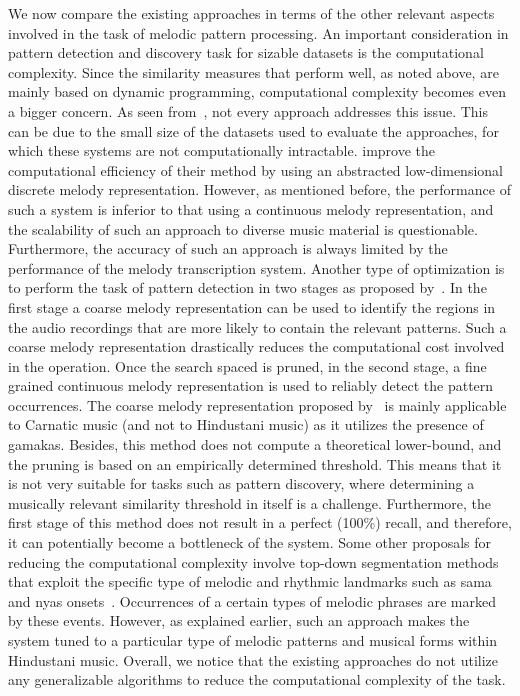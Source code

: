 We now compare the existing approaches in terms of the other relevant aspects involved in the task of melodic pattern processing. An important consideration in  pattern detection and discovery task for sizable datasets is the computational complexity. Since the similarity measures that perform well, as noted above, are mainly based on dynamic programming, computational complexity becomes even a bigger concern. As seen from~, not every approach addresses this issue. This can be due to the small size of the datasets used to evaluate the approaches, for which these systems are not computationally intractable. \cite{ganguli2015efficient} improve the computational efficiency of their method by using an abstracted low-dimensional discrete melody representation. However, as mentioned before, the performance of such a system is inferior to that using a continuous melody representation, and the scalability of such an approach to diverse music material is questionable. Furthermore, the accuracy of such an approach is always limited by the performance of the melody transcription system. Another type of optimization is to perform the task of pattern detection in two stages as proposed by~\cite{dutta2014modified,Ishwar2013}. In the first stage a coarse melody representation can be used to identify the regions in the audio recordings that are more likely to contain the relevant patterns. Such a coarse melody representation drastically reduces the computational cost involved in the operation. Once the search spaced is pruned, in the second stage, a fine grained continuous melody representation is used to reliably detect the pattern occurrences. The coarse melody representation proposed by~\cite{Ishwar2013} is mainly applicable to Carnatic music (and not to Hindustani music) as it utilizes the presence of \glspl{gamaka}. Besides, this method does not compute a theoretical lower-bound, and the pruning is based on an empirically determined threshold. This means that it is not very suitable for tasks such as pattern discovery, where determining a musically relevant similarity threshold in itself is a challenge. Furthermore, the first stage of this method does not result in a perfect (100\%) recall, and therefore, it can potentially become a bottleneck of the system. Some other proposals for reducing the computational complexity involve top-down segmentation methods that exploit the specific type of melodic and rhythmic landmarks such as \gls{sama} and \gls{nyas} onsets~\citep{Ross2012,Ross2012b}. Occurrences of a certain types of melodic phrases are marked by these events. However, as explained earlier, such an approach makes the system tuned to a particular type of melodic patterns and musical forms within Hindustani music. Overall, we notice that the existing approaches do not utilize any generalizable algorithms to reduce the computational complexity of the task. 

